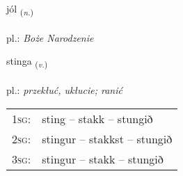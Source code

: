 \documentclass[frontgrid, backgrid]{flacards}\usepackage[]{graphicx}\usepackage[]{xcolor}
\begin{document}
\renewcommand{\flhead}{\vskip5pt \fboxsep=0pt {\small\bfseries\footnotesize Nafnorð | Noun}}
\renewcommand{\fcfoot}{\vskip5pt \fboxsep=0pt \hspace{2pt}{\small\bfseries\footnotesize 2K}}

\renewcommand{\blhead}{\vskip5pt {\small\bfseries\footnotesize Nafnorð | Noun }}
\renewcommand{\bcfoot}{\vskip5pt \hspace{2pt}{\small\bfseries\footnotesize 2K}}


{jól \small{\textsubscript{(\textit{n.})}} \\[1ex] %
\textphonetic{[jouːl]} \\
pl.: \emph{Boże Narodzenie} \\  [2ex]
\renewcommand*{\arraystretch}{0.8}
}

\renewcommand{\flhead}{\vskip5pt \fboxsep=0pt {\small\bfseries\footnotesize Sagnorð | Verb}}
\renewcommand{\fcfoot}{\vskip5pt \fboxsep=0pt \hspace{2pt}{\small\bfseries\footnotesize 2K}}

\renewcommand{\blhead}{\vskip5pt {\small\bfseries\footnotesize Sagnorð | Verb }}
\renewcommand{\bcfoot}{\vskip5pt \hspace{2pt}{\small\bfseries\footnotesize 2K}}


{stinga \small{\textsubscript{(\textit{v.})}} \\[1ex] %
\textphonetic{[stiŋka]} \\
pl.: \emph{przekłuć, ukłucie; ranić} \\  [2ex]
\renewcommand*{\arraystretch}{0.8}
\begin{tabular}{p{1cm}l}
\textsc{1sg}: & sting -- stakk -- stungið \\ 
\textsc{2sg}: & stingur -- stakkst -- stungið \\ 
\textsc{3sg}: & stingur -- stakk -- stungið \\ 
\end{tabular}
}
\end{document}
